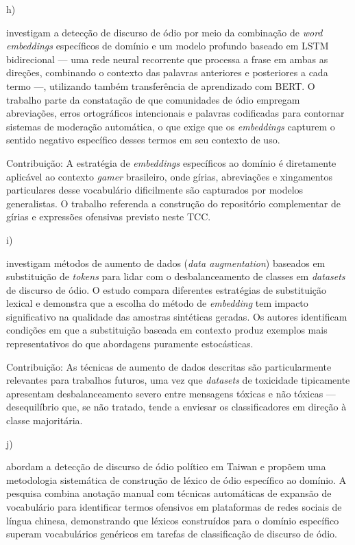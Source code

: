\documentclass{eic-bcc-tcc}
\begin{document}
h) \cite{saleh2023detection}

\cite{saleh2023detection} investigam a detecção de discurso de ódio por meio da combinação de \textit{word embeddings} específicos de domínio e um modelo profundo baseado em LSTM bidirecional — uma rede neural recorrente que processa a frase em ambas as direções, combinando o contexto das palavras anteriores e posteriores a cada termo —, utilizando também transferência de aprendizado com BERT. O trabalho parte da constatação de que comunidades de ódio empregam abreviações, erros ortográficos intencionais e palavras codificadas para contornar sistemas de moderação automática, o que exige que os \textit{embeddings} capturem o sentido negativo específico desses termos em seu contexto de uso.

Contribuição: A estratégia de \textit{embeddings} específicos ao domínio é diretamente aplicável ao contexto \textit{gamer} brasileiro, onde gírias, abreviações e xingamentos particulares desse vocabulário dificilmente são capturados por modelos generalistas. O trabalho referenda a construção do repositório complementar de gírias e expressões ofensivas previsto neste TCC.


i) \cite{madukwe2022token}

\cite{madukwe2022token} investigam métodos de aumento de dados (\textit{data augmentation}) baseados em substituição de \textit{tokens} para lidar com o desbalanceamento de classes em \textit{datasets} de discurso de ódio. O estudo compara diferentes estratégias de substituição lexical e demonstra que a escolha do método de \textit{embedding} tem impacto significativo na qualidade das amostras sintéticas geradas. Os autores identificam condições em que a substituição baseada em contexto produz exemplos mais representativos do que abordagens puramente estocásticas.

Contribuição: As técnicas de aumento de dados descritas são particularmente relevantes para trabalhos futuros, uma vez que \textit{datasets} de toxicidade tipicamente apresentam desbalanceamento severo entre mensagens tóxicas e não tóxicas — desequilíbrio que, se não tratado, tende a enviesar os classificadores em direção à classe majoritária.


j) \cite{wang2022political}

\cite{wang2022political} abordam a detecção de discurso de ódio político em Taiwan e propõem uma metodologia sistemática de construção de léxico de ódio específico ao domínio. A pesquisa combina anotação manual com técnicas automáticas de expansão de vocabulário para identificar termos ofensivos em plataformas de redes sociais de língua chinesa, demonstrando que léxicos construídos para o domínio específico superam vocabulários genéricos em tarefas de classificação de discurso de ódio.
\end{document}
